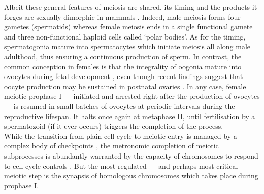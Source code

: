 


Albeit these general features of meiosis are shared, its timing and the products it forges are sexually dimorphic in mammals \citep[reviewed in][]{handel2010genetics}. 
Indeed, male meiosis forms four gametes (spermatids) whereas female meiosis ends in a single functional gamete and three non-functional haploid cells called ‘polar bodies’.
As for the timing, spermatogonia mature into spermatocytes which initiate meiosis all along male adulthood, thus ensuring a continuous production of sperm.
In contrast, the common conception in females is that the integrality of oogonia mature into ovocytes during fetal development \citep{pearl1921studies,zuckerman1951number}, even though recent findings suggest that oocyte production may be sustained in postnatal ovaries \citep{johnson2004germline,johnson2005oocyte}.
In any case, female meiotic prophase I — initiated and arrested right after the production of ovocytes — is resumed in small batches of ovocytes at periodic intervals during the reproductive lifespan.
It halts once again at metaphase II, until fertilisation by a spermatozoid (if it ever occurs) triggers the completion of the process.\\

While the transition from plain cell cycle to meiotic entry is managed by a complex body of checkpoints \citep[reviewed in][]{marston2005meiosis}, the metronomic completion of meiotic subprocesses is abundantly warranted by the capacity of chromosomes to respond to cell cycle controls \citep[reviewed in][]{mckim1995chromosomal}.
But the most regulated — and perhaps most critical — meiotic step is the synapsis of homologous chromosomes which takes place during prophase I.



